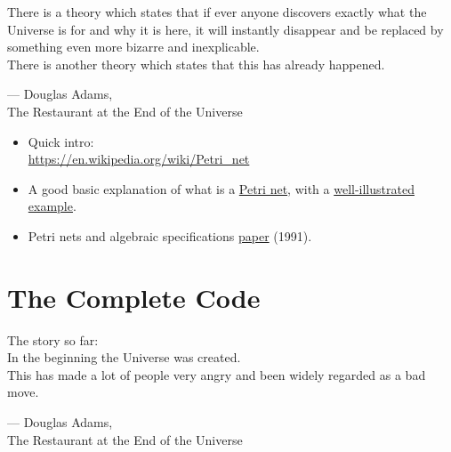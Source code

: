 \documentclass{article}
\begin{document}
\epigraph
{There is a theory which states that if ever anyone discovers exactly what the 
Universe is for and why it is here, it will instantly disappear and be replaced 
by something even more bizarre and inexplicable. \\
\hfill \break
There is another theory which states that this has already happened.}
{--- \textup{Douglas Adams},\\ The Restaurant at the End of the Universe}

\begin{itemize}

    \item Quick intro:\\ 
          \url{https://en.wikipedia.org/wiki/Petri_net}
    
    \item A good basic explanation of what is a 
          \href{https://www.techfak.uni-bielefeld.de/~mchen/BioPNML/Intro/pnfaq.html}
          {Petri net}, with a 
          \href{https://www.techfak.uni-bielefeld.de/~mchen/BioPNML/Intro/MRPN.html}
          {well-illustrated example}.

    \item Petri nets and algebraic specifications 
          \href{https://www.sciencedirect.com/science/article/pii/030439759190203E?via%3Dihub}
          {paper} (1991).

\end{itemize}

\newpage
\section{The Complete Code}

\epigraph
{The story so far: \\
\hfill \break
In the beginning the Universe was created.\\
\hfill \break
This has made a lot of people very angry and been widely regarded as a bad move.}
{--- \textup{Douglas Adams},\\ The Restaurant at the End of the Universe}
\end{document}
